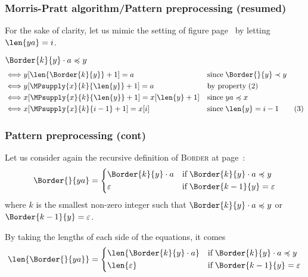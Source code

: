 %
\begin{frame}
\frametitle{Morris-Pratt algorithm/Pattern preprocessing (resumed)}

For the sake of clarity, let us mimic the setting of
figure page~\pageref{morris-pratt-conf} by letting \(\len{ya}=i\).

\bigskip

\(\Border{k}{y} \cdot a \preccurlyeq y\)
\begin{align*}
&\Longleftrightarrow y [\len{\Border{k}{y}} + 1] = a
&& \text{since} \; \Border{}{y} \prec y\\
&\Longleftrightarrow y [\MPsupply{x}{k}{\len{y}} + 1] = a
&& \text{by property} \; (2)\\
&\Longleftrightarrow x [\MPsupply{x}{k}{\len{y}} + 1] = x [\len{y} + 1]
&& \text{since} \; ya \preccurlyeq x\\
&\Longleftrightarrow x [\MPsupply{x}{k}{i-1} + 1] = x [i]
&& \text{since} \; \len{y} = i - 1 \tag{3}
\end{align*}

\end{frame}

%
\begin{frame}
\frametitle{Pattern preprocessing (cont)}

Let us consider again the recursive definition of \textsc{Border} at
page~\pageref{border_def}:
\[
\Border{}{ya} = 
\left\{
  \begin{aligned}
   & \Border{k}{y} \cdot a 
   && \text{if} \; \Border{k}{y} \cdot a \preccurlyeq y\\
   & \varepsilon 
   && \text{if} \; \Border{k-1}{y} = \varepsilon
  \end{aligned}
\right. 
\]
where \(k\) is the smallest non-zero integer such that \(\Border{k}{y}
\cdot a \preccurlyeq y\) or \(\Border{k-1}{y} = \varepsilon\).

\bigskip

By taking the lengths of each side of the equations, it comes
\[
\len{\Border{}{ya}} = 
\left\{
  \begin{aligned}
   & \len{\Border{k}{y} \cdot a }
   && \text{if} \; \Border{k}{y} \cdot a \preccurlyeq y\\
   & \len{\varepsilon}
   && \text{if} \; \Border{k-1}{y} = \varepsilon
  \end{aligned}
\right. 
\]

\end{frame}

